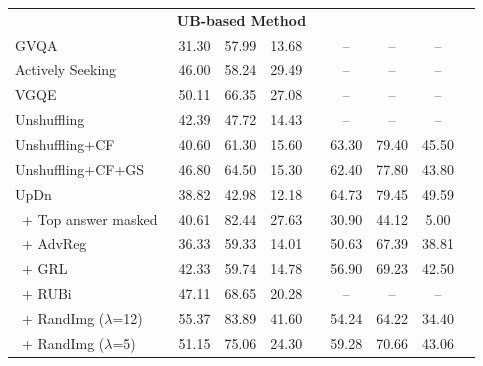 \begin{table}[!t]
{\begin{tabularx}{\textwidth}{@{}lcccccccc}
\midrule[0.5pt]
\midrule[0.5pt]
\multicolumn{9}{c}{\textbf{UB-based Method}} 
\\
GVQA~\cite{agrawal2018don} 
&31.30 &57.99 &13.68 &\cellcolor{cyan!10}{22.14}
&-- &-- &-- &\cellcolor{cyan!10}{}{--} 
\\
Actively Seeking~\cite{teney2019actively} 
&46.00 &58.24 &29.49 &\cellcolor{cyan!10}{44.33} 
&-- &-- &-- &\cellcolor{cyan!10}{--} 
\\
VGQE~\cite{kv2020reducing} 
&50.11 &66.35 &27.08 &\cellcolor{cyan!10}{46.77} 
&-- &-- &-- &\cellcolor{cyan!10}{--} 
\\

Unshuffling~\cite{teney2020unshuffling} 
&42.39 &47.72 &14.43 &\cellcolor{cyan!10}{47.24} 
&-- &-- &-- &\cellcolor{cyan!10}{--} 
\\

Unshuffling+CF~\cite{teney2020learning} 
&40.60 &61.30 &15.60 &\cellcolor{cyan!10}{46.00} 
&63.30 &79.40 &45.50 &\cellcolor{cyan!10}{53.70} 
\\

Unshuffling+CF+GS~\cite{teney2020learning}
&46.80 &64.50 &15.30 &\cellcolor{cyan!10}{45.90}
&62.40 &77.80 &43.80 &\cellcolor{cyan!10}{53.60}
\\ 

\midrule
UpDn~\cite{anderson2018bottom} 
&38.82  &42.98  &12.18  &\cellcolor{cyan!10}{43.95} 
&64.73  &79.45  &49.59  &\cellcolor{cyan!10}{55.66}  
\\

\, + Top answer masked~\cite{teney2020value} 
&40.61  &82.44  &27.63  &\cellcolor{cyan!10}{22.26} 
&30.90  &44.12  &5.00  &\cellcolor{cyan!10}{20.85} 
\\ 
\, + AdvReg~\cite{grand2019adversarial} 
&36.33  &59.33  &14.01  &\cellcolor{cyan!10}{30.41} 
&50.63  &67.39  &38.81  &\cellcolor{cyan!10}{38.37} 
\\ 
\, + GRL~\cite{grand2019adversarial}
&42.33 &59.74 &14.78 &\cellcolor{cyan!10}{40.76} 
&56.90 &69.23 &42.50 &\cellcolor{cyan!10}{49.36} 
\\

\, + RUBi~\cite{cadene2019rubi} 
&47.11 &68.65 &20.28 &\cellcolor{cyan!10}{43.18} 
&-- &-- &-- &\cellcolor{cyan!10}{--} 
\\

\, + RandImg ($\lambda$=12)~\cite{teney2020value} 
&55.37  &83.89  &41.60  &\cellcolor{cyan!10}{44.20}  
&54.24  &64.22  &34.40  &\cellcolor{cyan!10}{50.46}
\\
\, + RandImg ($\lambda$=5)~\cite{teney2020value}
&51.15  &75.06  &24.30  &\cellcolor{cyan!10}{45.99}  
&59.28  &70.66  &43.06  &\cellcolor{cyan!10}{53.40} 
\\ 


\end{tabularx}}
\end{table}
